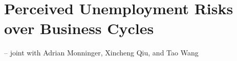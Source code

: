 \chapter[Perceived Unemployment Risks over Business Cycles]{Perceived Unemployment Risks over Business Cycles\raisebox{.3\baselineskip}{\normalsize\footnotemark}}
\begin{flushright}
{\large -- joint with Adrian Monninger, Xincheng Qiu, and Tao Wang}\end{flushright} 
